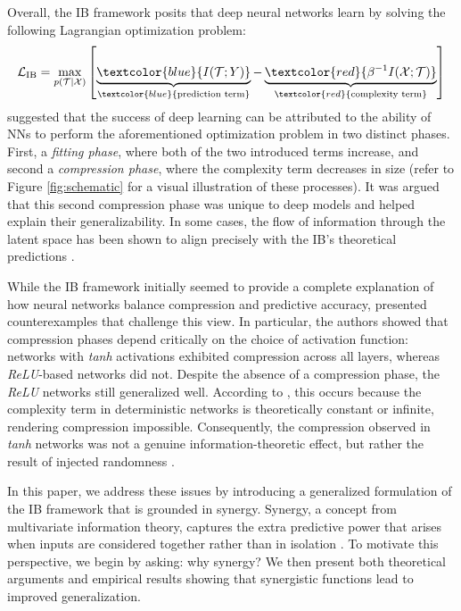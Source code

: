 \documentclass{article}
\theoremstyle{definition}
\theoremstyle{remark}
\begin{document}
Overall, the IB framework posits that deep neural networks learn by solving the following Lagrangian optimization problem: 
\begin{equation}
\mathcal{L}_{\text{IB}} = \max_{p(\mathcal{T}|\mathcal{X})} \left[ \underbrace{\textcolor{blue}{I(\mathcal{T};Y)}}_{\textcolor{blue}{\text{prediction term}}} -  \underbrace{\textcolor{red}{\beta^{-1}I(\mathcal{X};\mathcal{T})}}_{\textcolor{red}{\text{complexity term}}} \right]
\end{equation}
\cite{shwartz2017opening} suggested that the success of deep learning can be attributed to the ability of NNs to perform the aforementioned optimization problem in two distinct phases. First, a \textit{fitting phase}, where both of the two introduced terms increase, and second a \textit{compression phase}, where the complexity term decreases in size (refer to Figure \ref{fig:schematic} for a visual illustration of these processes). It was argued that this second compression phase was unique to deep models and helped explain their generalizability. In some cases, the flow of information through the latent space has been shown to align precisely with the IB's theoretical predictions \citep{shwartz2017opening}.

While the IB framework initially seemed to provide a complete explanation of how neural networks balance compression and predictive accuracy, \cite{saxe2018information} presented counterexamples that challenge this view. In particular, the authors showed that compression phases depend critically on the choice of activation function: networks with \textit{tanh} activations exhibited compression across all layers, whereas \textit{ReLU}-based networks did not. Despite the absence of a compression phase, the \textit{ReLU} networks still generalized well. According to \cite{goldfeld2019estimating}, this occurs because the complexity term in deterministic networks is theoretically constant or infinite, rendering compression impossible. Consequently, the compression observed in \textit{tanh} networks was not a genuine information-theoretic effect, but rather the result of injected randomness \citep{saxe2018information,shwartz2017opening,Geiger2022InformationPlaneReview}.

In this paper, we address these issues by introducing a generalized formulation of the IB framework that is grounded in synergy. Synergy, a concept from multivariate information theory, captures the extra predictive power that arises when inputs are considered together rather than in isolation \citep{williams2010nonnegative}. To motivate this perspective, we begin by asking: why synergy? We then present both theoretical arguments and empirical results showing that synergistic functions lead to improved generalization.
\end{document}

